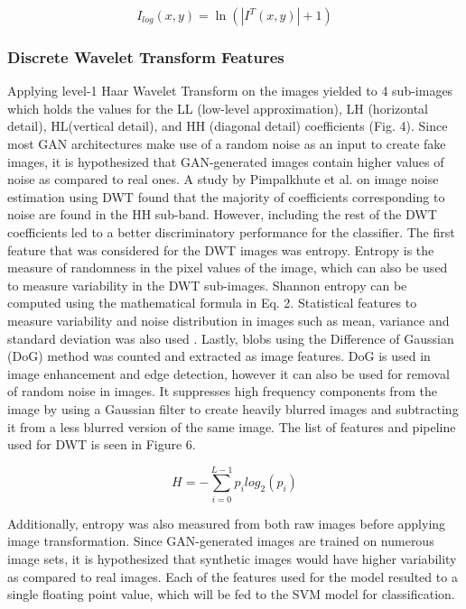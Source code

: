 \documentclass[journal]{./IEEE/IEEEtran}
\begin{document}
\begin{equation}
    I_{log}(x,y) = \ln(|I^{T}(x,y) | + 1)
\end{equation}

\subsubsection{Discrete Wavelet Transform Features}
Applying level-1 Haar Wavelet Transform on the images yielded to 4 sub-images which holds the values for the LL (low-level approximation), LH (horizontal detail), HL(vertical detail), and HH (diagonal detail) coefficients (Fig. 4). Since most GAN architectures make use of a random noise as an input to create fake images, it is hypothesized that GAN-generated images contain higher values of noise as compared to real ones. A study by Pimpalkhute et al. on image noise estimation using DWT \cite{dwt-noise} found that the majority of coefficients corresponding to noise are found in the HH sub-band. However, including the rest of the DWT coefficients led to a better discriminatory performance for the classifier. The first feature that was considered for the DWT images was entropy. Entropy is the measure of randomness in the pixel values of the image, which can also be used to measure variability in the DWT sub-images. Shannon entropy can be computed using the mathematical formula in Eq. 2. Statistical features to measure variability and noise distribution in images such as mean, variance and standard deviation was also used \cite{noise-estimation}. Lastly, blobs using the Difference of Gaussian (DoG) method was counted and extracted as image features. DoG is used in image enhancement and edge detection, however it can also be used for removal of random noise in images\cite{DoG}. It suppresses high frequency components from the image by using a Gaussian filter to create heavily blurred images and subtracting it from a less blurred version of the same image. The list of features and pipeline used for DWT is seen in Figure 6. 

\begin{equation}
   H = − \sum _{i=0}^{L-1}p_{i} log_{2}(p_{i})
\end{equation}

Additionally, entropy was also measured from both raw images before applying image transformation. Since GAN-generated images are trained on numerous image sets, it is hypothesized that synthetic images would have higher variability as compared to real images. Each of the features used for the model resulted to a single floating point value, which will be fed to the SVM model for classification. 
\end{document}
